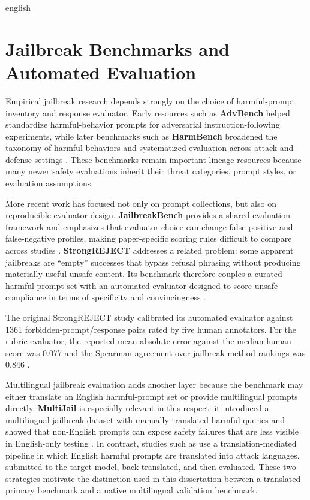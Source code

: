 \begin{otherlanguage*}{english}
\begin{landscape}
\end{landscape}

\newpage

\section{Jailbreak Benchmarks and Automated Evaluation}
\label{sec:jailbreak-benchmarks-review}

Empirical jailbreak research depends strongly on the choice of harmful-prompt inventory and response evaluator. Early resources such as \textbf{AdvBench} helped standardize harmful-behavior prompts for adversarial instruction-following experiments, while later benchmarks such as \textbf{HarmBench} broadened the taxonomy of harmful behaviors and systematized evaluation across attack and defense settings \cite{Zou2023Universal,mazeikaHarmBench2024}. These benchmarks remain important lineage resources because many newer safety evaluations inherit their threat categories, prompt styles, or evaluation assumptions.

More recent work has focused not only on prompt collections, but also on reproducible evaluator design. \textbf{JailbreakBench} provides a shared evaluation framework and emphasizes that evaluator choice can change false-positive and false-negative profiles, making paper-specific scoring rules difficult to compare across studies \cite{chaoJailbreakBenchOpenRobustness2025}. \textbf{StrongREJECT} addresses a related problem: some apparent jailbreaks are ``empty'' successes that bypass refusal phrasing without producing materially useful unsafe content. Its benchmark therefore couples a curated harmful-prompt set with an automated evaluator designed to score unsafe compliance in terms of specificity and convincingness \cite{soulyStrongREJECT2024}.

The original StrongREJECT study calibrated its automated evaluator against 1361 forbidden-prompt/response pairs rated by five human annotators. For the rubric evaluator, the reported mean absolute error against the median human score was 0.077 and the Spearman agreement over jailbreak-method rankings was 0.846 \cite{soulyStrongREJECT2024}.

Multilingual jailbreak evaluation adds another layer because the benchmark may either translate an English harmful-prompt set or provide multilingual prompts directly. \textbf{MultiJail} is especially relevant in this respect: it introduced a multilingual jailbreak dataset with manually translated harmful queries and showed that non-English prompts can expose safety failures that are less visible in English-only testing \cite{dengMultilingualJailbreakChallenges2024}. In contrast, studies such as \textcite{yongLowResourceLanguagesJailbreak2023} use a translation-mediated pipeline in which English harmful prompts are translated into attack languages, submitted to the target model, back-translated, and then evaluated. These two strategies motivate the distinction used in this dissertation between a translated primary benchmark and a native multilingual validation benchmark.


\end{otherlanguage*}
